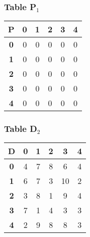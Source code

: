 \documentclass{beamer}
\begin{document}
\begin{frame}
\frametitle{Table P$_{1}$}
\begin{center}
    \begin{tabular}{|c||c|c|c|c|c|}
        \hline
        \textbf{P} & \textbf{0} & \textbf{1} & \textbf{2} & \textbf{3} & \textbf{4} \\
        \hline
        \hline
        \textbf{0}& 0 & 0 & 0 & 0 & 0 \\
        \hline
        \textbf{1}& 0 & 0 & 0 & 0 & 0 \\
        \hline
        \textbf{2}& 0 & 0 & 0 & \cellcolor{yellow}0 & 0 \\
        \hline
        \textbf{3}& 0 & 0 & 0 & 0 & 0 \\
        \hline
        \textbf{4}& 0 & 0 & 0 & \cellcolor{yellow}0 & 0 \\
        \hline
    \end{tabular}
\end{center}


\end{frame}


\begin{frame}
\frametitle{Table D$_{2}$}
\begin{center}
    \begin{tabular}{|c||c|c|c|c|c|}
        \hline
        \textbf{D} & \textbf{0} & \textbf{1} & \textbf{2} & \textbf{3} & \textbf{4} \\
        \hline
        \hline
        \textbf{0}& 4 & 7 & 8 & 6 & 4 \\
        \hline
        \textbf{1}& 6 & 7 & 3 & 10 & 2 \\
        \hline
        \textbf{2}& 3 & 8 & 1 & 9 & 4 \\
        \hline
        \textbf{3}& 7 & 1 & \cellcolor{yellow}4 & 3 & \cellcolor{yellow}3 \\
        \hline
        \textbf{4}& 2 & 9 & 8 & 8 & 3 \\
        \hline
    \end{tabular}
\end{center}


\end{frame}
\end{document}
